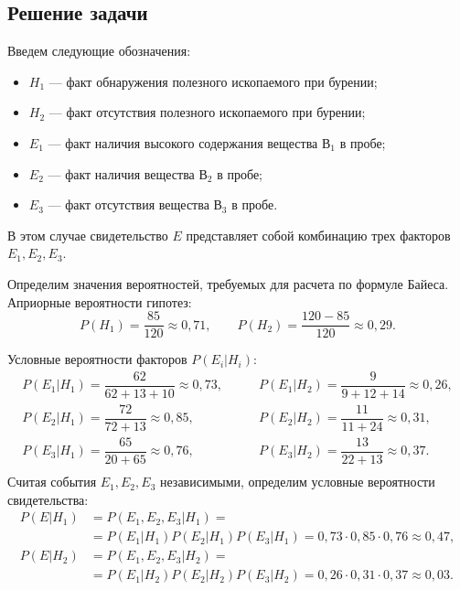 \newpage

\subsection{Решение задачи}

Введем следующие обозначения:
\begin{itemize}
\item \( H_1 \) --- факт обнаружения полезного ископаемого при бурении;
\item \( H_2 \) --- факт отсутствия полезного ископаемого при бурении;
\item \( E_1 \) --- факт наличия высокого содержания вещества \( \text{В}_1 \)
  в пробе;
\item \( E_2 \) --- факт наличия вещества \( \text{В}_2 \)
  в пробе;
\item \( E_3 \) --- факт отсутствия вещества \( \text{В}_3 \)
  в пробе.
\end{itemize}

В этом случае свидетельство \( E \) представляет собой комбинацию трех
факторов \( E_1, E_2, E_3 \).

Определим значения вероятностей, требуемых для расчета по формуле Байеса.
Априорные вероятности гипотез:
\begin{equation*}
  P(H_1) = \dfrac{85}{120} \approx 0{,}71, \qquad   P(H_2) = \dfrac{120-85}{120} \approx 0{,}29.
\end{equation*}

Условные вероятности факторов \( P(E_i | H_i) \):
\begin{align*}
  P(E_1 | H_1) = \dfrac{62}{62 + 13 + 10} \approx 0{,}73, \qquad &
  P(E_1 | H_2) = \dfrac{9}{9 + 12 + 14} \approx 0{,}26, \\
  P(E_2 | H_1) = \dfrac{72}{72 + 13} \approx 0{,}85, \qquad &
  P(E_2 | H_2) = \dfrac{11}{11 + 24} \approx 0{,}31, \\
  P(E_3 | H_1) = \dfrac{65}{20 + 65} \approx 0{,}76, \qquad &
  P(E_3 | H_2) = \dfrac{13}{22 + 13} \approx 0{,}37. \\
\end{align*}
Считая события \( E_1, E_2, E_3 \) независимыми, определим условные вероятности
свидетельства:
\begin{align*}
  P(E | H_1) &= P(E_1,E_2,E_3 | H_1) = \\
             &= P(E_1| H_1) P(E_2| H_1) P(E_3| H_1) = 0{,}73 \cdot 0{,}85 \cdot 0{,}76 \approx 0{,}47, \\
  P(E | H_2) &= P(E_1,E_2,E_3 | H_2) = \\
             &= P(E_1| H_2) P(E_2| H_2) P(E_3| H_2) = 0{,}26 \cdot 0{,}31 \cdot 0{,}37 \approx 0{,}03. \\
\end{align*}


